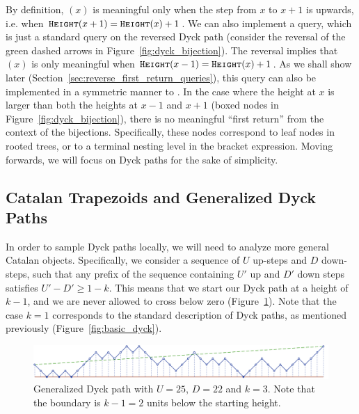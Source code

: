 By definition, $(x)$ is meaningful only when the step from $x$ to $x+1$ is upwards,
i.e. when $\texttt{\textsc{Height}}(x+1) = \texttt{\textsc{Height}}(x) + 1$.
We can also implement a  query, which is just a standard  query on the reversed Dyck path
(consider the reversal of the green dashed arrows in Figure~\ref{fig:dyck_bijection}).
The reversal implies that $(x)$ is only meaningful when $\texttt{\textsc{Height}}(x-1) = \texttt{\textsc{Height}}(x) + 1$.
As we shall show later (Section~\ref{sec:reverse_first_return_queries}),
this query can also be implemented in a symmetric manner to .
In the case where the height at $x$ is larger than both the heights at $x-1$ and $x+1$ (boxed nodes in Figure~\ref{fig:dyck_bijection}),
there is no meaningful ``first return'' from the context of the bijections.
Specifically, these nodes correspond to leaf nodes in rooted trees, or to a terminal nesting level in the bracket expression.
Moving forwards, we will focus on Dyck paths for the sake of simplicity.



\subsection{Catalan Trapezoids and Generalized Dyck Paths}
In order to sample Dyck paths locally, we will need to analyze more general Catalan objects.
Specifically, we consider a sequence of $U$ up-steps and $D$ down-steps,
such that any prefix of the sequence containing $U'$ up and $D'$ down steps satisfies $U'-D' \ge 1-k$.
This means that we start our Dyck path at a height of $k-1$, and we are never allowed to cross below zero (Figure~\ref{fig:complex_dyck}).
Note that the case $k=1$ corresponds to the standard description of Dyck paths, as mentioned previously (Figure~\ref{fig:basic_dyck}).
\begin{figure}[htbp]
    \centering
    \includegraphics[width=\textwidth]{images/complex_dyck_path.pdf}
    \caption{Generalized Dyck path with $U = 25$, $D = 22$ and $k = 3$.
             Note that the boundary is $k-1 = 2$ units below the starting height.} \label{fig:complex_dyck}
\end{figure}

